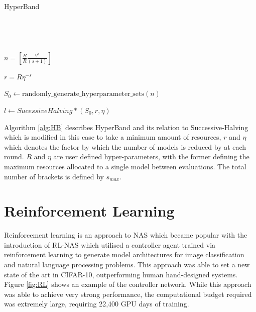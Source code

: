 		\begin{algorithm}[H]\label{alg:HB}
			\caption{HyperBand}

			\SetAlgoLined
			\
			
			\



				{
				\(n = \left[ \frac{B}{R}\frac{\eta^s}{(s+1)} \right]\)\;

				\(r = R\eta^{-s}\)\;

				\(S_0 \leftarrow \text{randomly\_generate\_hyperparameter\_sets}(n)\)\;

				\(l \leftarrow SucessiveHalving*(S_0,r,\eta)\)\;

				}

		\end{algorithm}

		Algorithm \ref{alg:HB} describes HyperBand and its relation to Successive-Halving which is modified in this case to take a minimum amount of resources, \(r\) and \(\eta\) which denotes the factor by which the number of models is reduced by at each round. \(R\) and \(\eta\) are user defined hyper-parameters, with the former defining the maximum resources allocated to a single model between evaluations. The total number of brackets is defined by \(s_{max}\). 


\section{Reinforcement Learning}

	Reinforcement learning is an approach to NAS which became popular with the introduction of RL-NAS \cite{NAS-RL} which utilised a controller agent trained via reinforcement learning to generate model architectures for image classification and natural language processing problems. This approach was able to set a new state of the art in CIFAR-10, outperforming human hand-designed systems. Figure \ref{fig:RL} shows an example of the controller network. While this approach was able to achieve very strong performance, the computational budget required was extremely large, requiring 22,400 GPU days of training. 
 
